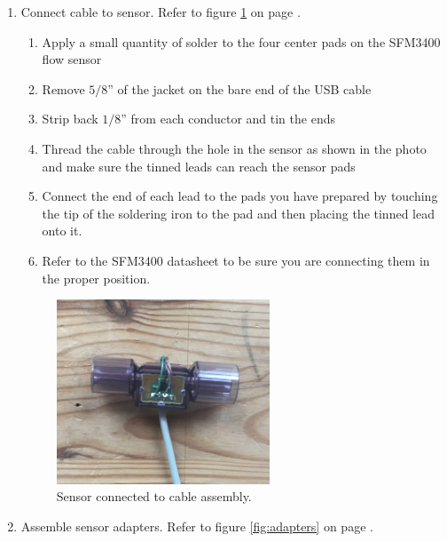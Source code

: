 \documentclass[11pt, letterpaper]{article}
\begin{document}
\begin{enumerate}
\begin{enumerate}[label=4.\arabic*]
\item
Connect cable to sensor.  Refer to figure \ref{fig:flow_sensor} on page \pageref{fig:flow_sensor}.

\begin{enumerate}[label=4.2.\arabic*]
\item
Apply a small quantity of solder to the four center pads on the SFM3400 flow sensor
\item
Remove $5/8$'' of the jacket on the bare end of the USB cable
\item
Strip back $1/8$'' from each conductor and tin the ends
\item
Thread the cable through the hole in the sensor as shown in the photo and make sure the tinned leads can reach the sensor pads
\item
Connect the end of each lead to the pads you have prepared by touching the tip of the soldering iron to the pad and then placing the tinned lead onto it.
\item
Refer to the SFM3400 datasheet to be sure you are connecting them in the proper position.
\end{enumerate}
\begin{figure}[H]
\label{fig:flow_sensor}
\centering
\includegraphics[width=0.6\textwidth]{images/flow_cable.JPG}
\caption{Sensor connected to cable assembly.}
\end{figure}

\item
Assemble sensor adapters. Refer to figure \ref{fig:adapters} on page \pageref{fig:adapters}.


\end{enumerate}
\end{enumerate}
\end{document}
